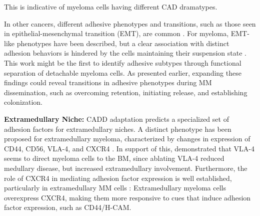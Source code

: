 This is indicative of myeloma cells
having different \ac{CAD} dramatypes.






In other cancers, different
adhesive phenotypes and transitions, such as those seen in
epithelial-mesenchymal transition (EMT), are common
\cite{gengDynamicSwitchTwo2014}. For myeloma, EMT-like phenotypes have been
described, but a clear association with distinct adhesion behaviors is hindered
by the cells maintaining their suspension state
\cite{roccaroCXCR4RegulatesExtraMedullary2015,
      qianSETDB1InducesLenalidomide2023}. This work might be the first to identify
adhesive subtypes through functional separation of detachable myeloma cells. As
presented earlier, expanding these findings could reveal transitions in adhesive
phenotypes during MM dissemination, such as overcoming retention, initiating
release, and establishing colonization.


\textbf{Extramedullary Niche:}
\ac{CADD} adaptation predicts a specialized set of adhesion factors for
extramedullary niches. A distinct phenotype has been proposed for extramedullary
myeloma, characterized by changes in
expression of CD44, CD56, VLA-4, and CXCR4
\cite{guptaExtramedullaryMultipleMyeloma2022}. In support of this,
\cite{hathiAblationVLA4Multiple2022} demonstrated that VLA-4 seems to direct
myeloma cells to the BM, since ablating VLA-4 reduced medullary disease, but
increased extramedullary involvement. Furthermore, the role of CXCR4 in
mediating adhesion factor expression is well established, particularly in
extramedullary MM cells \cite{roccaroCXCR4RegulatesExtraMedullary2015,
      guptaExtramedullaryMultipleMyeloma2022}: Extramedullary myeloma cells
overexpress CXCR4, making them more responsive to cues that induce adhesion
factor expression, such as CD44/H-CAM.



